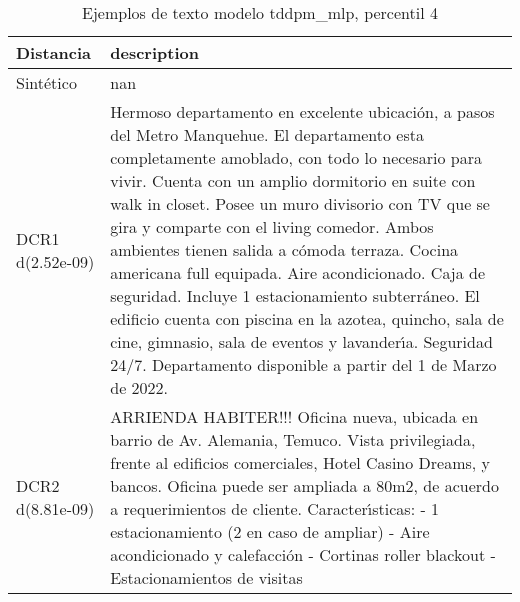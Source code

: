 \begin{table}[H]
\centering
\fontsize{10}{14}\selectfont
\caption{Ejemplos de texto modelo tddpm\_mlp, percentil 4}
\label{table-example-economicos-a-3-tddpm_mlp-4p-text}
\begin{tabular}{|l|m{35em}|}
\hline
\rowcolor[gray]{0.8}
Distancia & description \\
\hline Sintético & nan \\
\hline DCR1 d(2.52e-09) & Hermoso departamento en excelente ubicaci\'on, a pasos del Metro Manquehue.   El departamento esta completamente amoblado, con todo lo necesario para vivir. Cuenta con un amplio dormitorio en suite con walk in closet. Posee un muro divisorio con TV que se gira y comparte con el living comedor. Ambos ambientes tienen salida a c\'omoda terraza. Cocina americana full equipada. Aire acondicionado. Caja de seguridad.   Incluye 1 estacionamiento subterr\'aneo. El edificio cuenta con piscina en la azotea, quincho, sala de cine, gimnasio, sala de eventos y lavander{\'\i}a. Seguridad 24/7.  Departamento disponible a partir del 1 de Marzo de 2022. \\
\hline DCR2 d(8.81e-09) & ARRIENDA HABITER!!!  Oficina nueva, ubicada en barrio de Av. Alemania, Temuco.  Vista privilegiada, frente al edificios comerciales, Hotel Casino Dreams, y bancos.  Oficina puede ser ampliada a 80m2, de acuerdo a requerimientos de cliente.  Caracter{\'\i}sticas: - 1 estacionamiento (2 en caso de ampliar) - Aire acondicionado y calefacci\'on - Cortinas roller blackout - Estacionamientos de visitas \\
\hline
\end{tabular}
\end{table}
